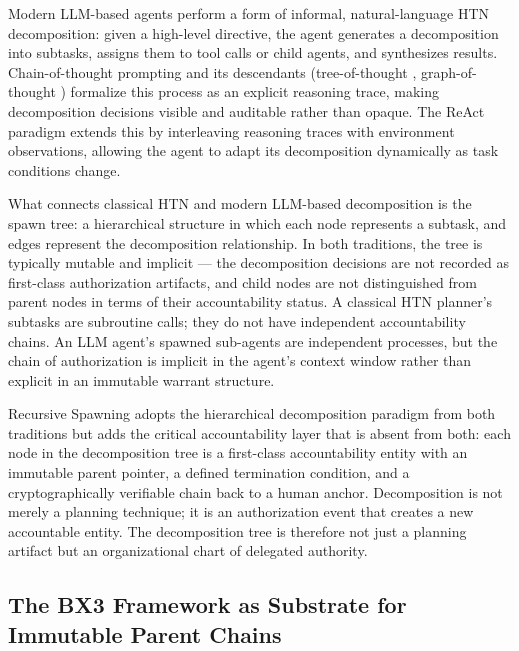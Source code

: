 Modern LLM-based agents perform a form of informal, natural-language HTN decomposition: given a high-level directive, the agent generates a decomposition into subtasks, assigns them to tool calls or child agents, and synthesizes results. Chain-of-thought prompting \cite{wei2022} and its descendants (tree-of-thought \cite{yao2023}, graph-of-thought \cite{besta2024}) formalize this process as an explicit reasoning trace, making decomposition decisions visible and auditable rather than opaque. The ReAct paradigm \cite{yao2022} extends this by interleaving reasoning traces with environment observations, allowing the agent to adapt its decomposition dynamically as task conditions change.

What connects classical HTN and modern LLM-based decomposition is the spawn tree: a hierarchical structure in which each node represents a subtask, and edges represent the decomposition relationship. In both traditions, the tree is typically mutable and implicit --- the decomposition decisions are not recorded as first-class authorization artifacts, and child nodes are not distinguished from parent nodes in terms of their accountability status. A classical HTN planner's subtasks are subroutine calls; they do not have independent accountability chains. An LLM agent's spawned sub-agents are independent processes, but the chain of authorization is implicit in the agent's context window rather than explicit in an immutable warrant structure.

Recursive Spawning adopts the hierarchical decomposition paradigm from both traditions but adds the critical accountability layer that is absent from both: each node in the decomposition tree is a first-class accountability entity with an immutable parent pointer, a defined termination condition, and a cryptographically verifiable chain back to a human anchor. Decomposition is not merely a planning technique; it is an authorization event that creates a new accountable entity. The decomposition tree is therefore not just a planning artifact but an organizational chart of delegated authority.

\subsection{The BX3 Framework as Substrate for Immutable Parent Chains}

